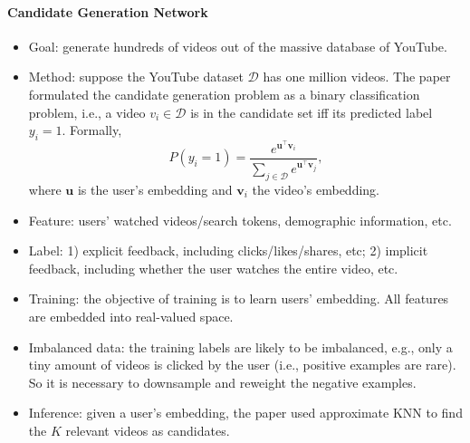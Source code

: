     \paragraph{Candidate Generation Network}
        \begin{itemize}
            \item Goal: generate hundreds of videos out of the massive database of YouTube.
            \item Method: suppose the YouTube dataset $\mathcal{D}$ has one million videos. 
            The paper formulated the candidate generation problem as a binary classification problem, i.e., a video $v_i \in \mathcal{D}$ is in the candidate set iff its predicted label  $y_i = 1$.
            Formally,
                \begin{equation}
                    P(y_i = 1) = \frac{e^{\bm{u}^\top \bm{v}_i}}{ \sum_{j \in \mathcal{D}}^{}{e^{\bm{u}^\top \bm{v}_j}}},
                \end{equation}
            where $\bm{u}$ is the user's embedding and $\bm{v}_i$ the video's embedding.
            \item Feature: users' watched videos/search tokens, demographic information, etc.
            \item Label: 1) explicit feedback, including clicks/likes/shares, etc; 2) implicit feedback, including whether the user watches the entire video, etc.
            \item Training: the objective of training is to learn users' embedding.
            All features are embedded into real-valued space.
            \item Imbalanced data: the training labels are likely to be imbalanced, e.g., only a tiny amount of videos is clicked by the user (i.e., positive examples are rare). 
            So it is necessary to downsample and reweight the negative examples.
            \item Inference: given a user's embedding, the paper used approximate KNN to find the $K$ relevant videos as candidates. 
        \end{itemize}
